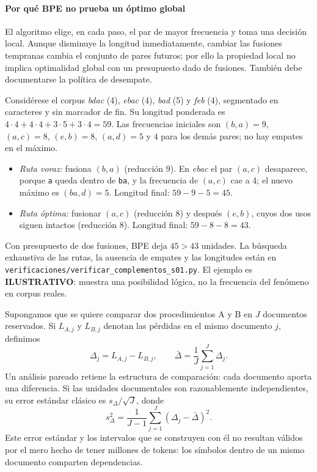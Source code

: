 \paragraph{Por qué BPE no prueba un óptimo global}
El algoritmo elige, en cada paso, el par de mayor frecuencia y toma una
decisión local. Aunque disminuye la longitud inmediatamente, cambiar las
fusiones tempranas cambia el conjunto de pares futuros; por ello la
propiedad local no implica optimalidad global con un presupuesto dado de
fusiones. También debe documentarse la política de desempate.
\begin{ejemplo}
Considérese el corpus \emph{bdac} (4), \emph{ebac} (4), \emph{bad} (5) y
\emph{feb} (4), segmentado en caracteres y sin marcador de fin. Su longitud
ponderada es $4\cdot4+4\cdot4+3\cdot5+3\cdot4=59$. Las frecuencias iniciales son
$(b,a)=9$, $(a,c)=8$, $(e,b)=8$, $(a,d)=5$ y $4$ para los demás pares; no hay
empates en el máximo.
\begin{itemize}
\item \emph{Ruta voraz:} fusiona $(b,a)$ (reducción 9). En \emph{ebac} el par
$(a,c)$ desaparece, porque \texttt{a} queda dentro de \texttt{ba}, y la frecuencia
de $(a,c)$ cae a 4; el nuevo máximo es $(ba,d)=5$. Longitud final:
$59-9-5=45$.
\item \emph{Ruta óptima:} fusionar $(a,c)$ (reducción 8) y después $(e,b)$, cuyos
dos usos siguen intactos (reducción 8). Longitud final: $59-8-8=43$.
\end{itemize}
Con presupuesto de dos fusiones, BPE deja $45>43$ unidades. La búsqueda exhaustiva
de las rutas, la ausencia de empates y las longitudes están en
\nolinkurl{verificaciones/verificar_complementos_s01.py}. El ejemplo es
\textbf{ILUSTRATIVO}: muestra una posibilidad lógica, no la frecuencia del fenómeno
en corpus reales.
\end{ejemplo}

Supongamos que se quiere comparar dos procedimientos A y B en $J$
documentos reservados. Si $L_{A,j}$ y $L_{B,j}$ denotan las pérdidas
en el mismo documento $j$, definimos
\[
\Delta_j=L_{A,j}-L_{B,j},\qquad \bar\Delta=\frac1J\sum_{j=1}^J\Delta_j.
\]
Un análisis pareado retiene la estructura de comparación: cada documento
aporta una diferencia. Si las unidades documentales son razonablemente
independientes, su error estándar clásico es $s_\Delta/\sqrt J$, donde
\[
s_\Delta^2=\frac1{J-1}\sum_{j=1}^J(\Delta_j-\bar\Delta)^2.
\]
Este error estándar y los intervalos que se construyen con él no
resultan válidos por el mero hecho de tener millones de tokens: los
símbolos dentro de un mismo documento comparten dependencias.


